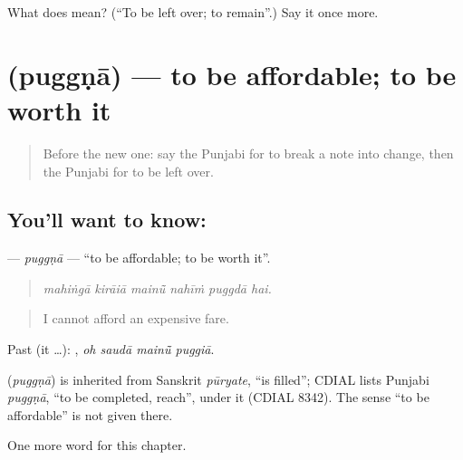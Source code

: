 \begin{tcolorbox}[breakable,colback=teal!4,colframe=teal!35!black,title={Before you move on}]
What does  mean? (\textquotedblleft{}To be left over; to remain\textquotedblright{}.) Say it once more.
\end{tcolorbox}
\section[\texorpdfstring{\pa{ਪੁੱਗਣਾ} (puggṇā)}{ਪੁੱਗਣਾ (puggṇā)}]{ (puggṇā) — to be affordable; to be worth it}

\label{lesson:PA-C280-puggna}



\begin{quote}
Before the new one: say the Punjabi for to break a note into change, then the Punjabi for to be left over.
\end{quote}

\subsection*{You'll want to know: }
\textbf{} — \emph{puggṇā} — \textquotedblleft{}to be affordable; to be worth it\textquotedblright{}.

\begin{quote}
     
\end{quote}

\begin{quote}
\emph{mahiṅgā kirāiā mainū̃ nahīṁ puggdā hai.}
\end{quote}

\begin{quote}
I cannot afford an expensive fare.
\end{quote}

Past (it …):    , \emph{oh saudā mainū̃ puggiā}.

\begin{cousinweb}
\textbf{} (\emph{puggṇā}) is inherited from Sanskrit \emph{pūryate}, \textquotedblleft{}is filled\textquotedblright{}; CDIAL lists Punjabi \emph{puggṇā}, \textquotedblleft{}to be completed, reach\textquotedblright{}, under it (CDIAL 8342). The sense \textquotedblleft{}to be affordable\textquotedblright{} is not given there.
\end{cousinweb}

\begin{grammarlens}[title={What you've built}]
One more word for this chapter.
\end{grammarlens}


